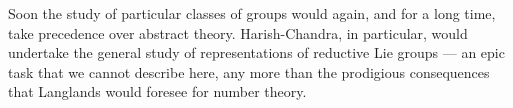 Soon the study of particular classes of groups would again, and for a long time, take precedence over abstract theory. Harish-Chandra, in particular, would undertake the general study of representations of reductive Lie groups --- an epic task that we cannot describe here, any more than the prodigious consequences that Langlands would foresee for number theory.

